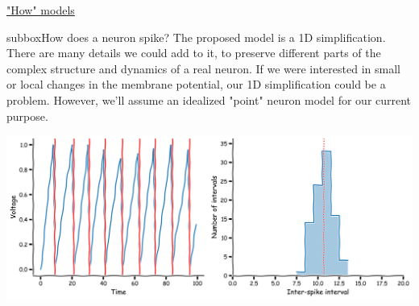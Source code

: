 \begin{textbox}{\href{https://compneuro.neuromatch.io/tutorials/W1D1_ModelTypes/student/W1D1_Tutorial2.html}{"How" models } }
\begin{subbox}{subbox}{How does a neuron spike? }
The proposed model is a 1D simplification. There are many details we could add to it, to preserve different parts of the complex structure and dynamics of a real neuron. If we were interested in small or local changes in the membrane potential, our 1D simplification could be a problem. However, we'll assume an idealized "point" neuron model for our current purpose.
\begin{center}
    
\includegraphics[scale=0.08]{Figures/MT/MT_Figure5.png}
\end{center}
\end{subbox}
\end{textbox}
